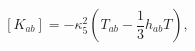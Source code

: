 \begin{equation}
\left[ K_{ab} \right] = -\kappa_5^2 \left(T_{ab} 
- \frac{1}{3} h_{ab}T \right),
\end{equation}

